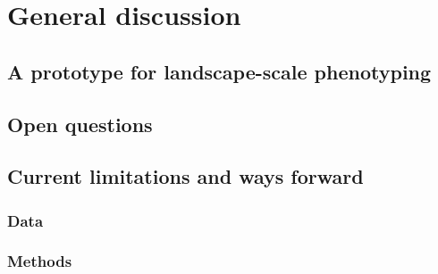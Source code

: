\chapter{General discussion}
\label{chap:general-discussion}

\section{A prototype for landscape-scale phenotyping}

\section{Open questions}

\section{Current limitations and ways forward}
\subsection{Data}
\subsection{Methods}
